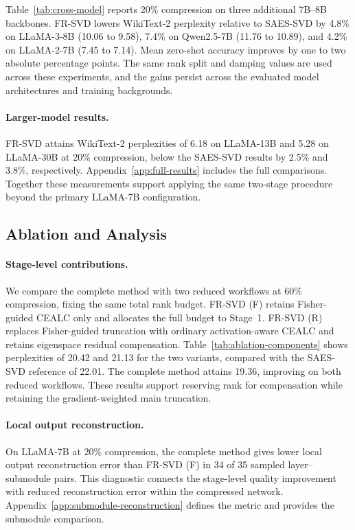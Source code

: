 \documentclass[11pt]{article}
\begin{document}
Table~\ref{tab:cross-model} reports 20\% compression on three additional 7B--8B backbones. FR-SVD lowers WikiText-2 perplexity relative to SAES-SVD by 4.8\% on LLaMA-3-8B (10.06 to 9.58), 7.4\% on Qwen2.5-7B (11.76 to 10.89), and 4.2\% on LLaMA-2-7B (7.45 to 7.14). Mean zero-shot accuracy improves by one to two absolute percentage points. The same rank split and damping values are used across these experiments, and the gains persist across the evaluated model architectures and training backgrounds.


\paragraph{Larger-model results.}
FR-SVD attains WikiText-2 perplexities of 6.18 on LLaMA-13B and 5.28 on LLaMA-30B at 20\% compression, below the SAES-SVD results by 2.5\% and 3.8\%, respectively. Appendix~\ref{app:full-results} includes the full comparisons. Together these measurements support applying the same two-stage procedure beyond the primary LLaMA-7B configuration.

\subsection{Ablation and Analysis}\label{sec:ablation}

\paragraph{Stage-level contributions.}

We compare the complete method with two reduced workflows at 60\% compression, fixing the same total rank budget. FR-SVD (F) retains Fisher-guided CEALC only and allocates the full budget to Stage~1. FR-SVD (R) replaces Fisher-guided truncation with ordinary activation-aware CEALC and retains eigenspace residual compensation. Table~\ref{tab:ablation-components} shows perplexities of 20.42 and 21.13 for the two variants, compared with the SAES-SVD reference of 22.01. The complete method attains 19.36, improving on both reduced workflows. These results support reserving rank for compensation while retaining the gradient-weighted main truncation.



\paragraph{Local output reconstruction.}
On LLaMA-7B at 20\% compression, the complete method gives lower local output reconstruction error than FR-SVD (F) in 34 of 35 sampled layer--submodule pairs. This diagnostic connects the stage-level quality improvement with reduced reconstruction error within the compressed network. Appendix~\ref{app:submodule-reconstruction} defines the metric and provides the submodule comparison.
\end{document}
